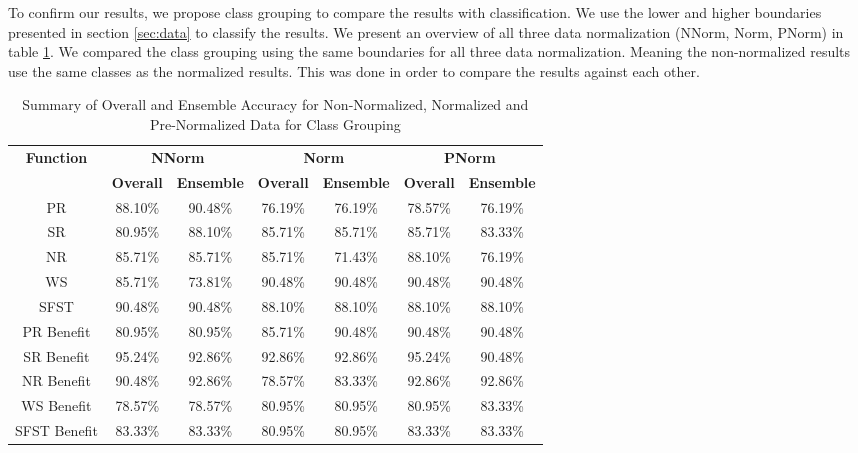 \documentclass[12pt,letterpaper]{article}
\begin{document}
To confirm our results, we propose class grouping to compare the results with classification.
We use the lower and higher boundaries presented in section \ref{sec:data} to classify the results.
We present an overview of all three data normalization (\ac{NNorm}, \ac{Norm}, \ac{PNorm}) in table \ref{reg_all_tab:summary_grouping}.
We compared the class grouping using the same boundaries for all three data normalization.
Meaning the non-normalized results use the same classes as the normalized results.
This was done in order to compare the results against each other.

\begin{table}[H]
\centering
\begin{tabular}{|c||c|c||c|c||c|c|}
\hline
\multirow{2}{*}{\textbf{Function}} & \multicolumn{2}{c||}{\textbf{\ac{NNorm}}} & \multicolumn{2}{c||}{\textbf{Norm}} & \multicolumn{2}{c|}{\textbf{\ac{PNorm}}} \\
\cline{2-7}
 & \textbf{Overall} & \textbf{Ensemble} & \textbf{Overall} & \textbf{Ensemble} & \textbf{Overall} & \textbf{Ensemble} \\
\hline
PR & 88.10\% & 90.48\% & 76.19\% & 76.19\% & 78.57\% & 76.19\% \\
\hline
SR & 80.95\% & 88.10\% & 85.71\% & 85.71\% & 85.71\% & 83.33\% \\
\hline
NR & 85.71\% & 85.71\% & 85.71\% & 71.43\% & 88.10\% & 76.19\% \\
\hline
WS & 85.71\% & 73.81\% & 90.48\% & 90.48\% & 90.48\% & 90.48\% \\
\hline
SFST & 90.48\% & 90.48\% & 88.10\% & 88.10\% & 88.10\% & 88.10\% \\
\hline

PR Benefit & 80.95\% & 80.95\% & 85.71\% & 90.48\% & 90.48\% & 90.48\% \\
\hline
SR Benefit & 95.24\% & 92.86\% & 92.86\% & 92.86\% & 95.24\% & 90.48\% \\
\hline
NR Benefit & 90.48\% & 92.86\% & 78.57\% & 83.33\% & 92.86\% & 92.86\% \\
\hline
WS Benefit & 78.57\% & 78.57\% & 80.95\% & 80.95\% & 80.95\% & 83.33\% \\
\hline
SFST Benefit & 83.33\% & 83.33\% & 80.95\% & 80.95\% & 83.33\% & 83.33\% \\
\hline
\end{tabular}
\caption{Summary of Overall and Ensemble Accuracy for Non-Normalized, Normalized and Pre-Normalized Data for Class Grouping}
\label{reg_all_tab:summary_grouping}
\end{table}
\end{document}

